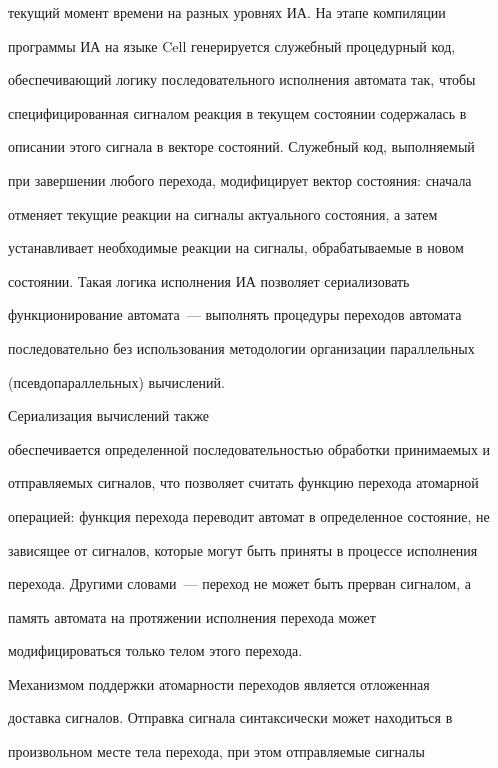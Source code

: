 текущий момент времени на разных уровнях ИА. На этапе компиляции 


программы ИА на языке Cell генерируется служебный процедурный код, 


обеспечивающий логику последовательного исполнения автомата так, чтобы 


специфицированная сигналом реакция в текущем состоянии содержалась в 


описании этого сигнала в векторе состояний. Служебный код, выполняемый 


при завершении любого перехода, модифицирует вектор состояния: сначала 


отменяет текущие реакции на сигналы актуального состояния, а затем 


устанавливает необходимые реакции на сигналы, обрабатываемые в новом 


состоянии. Такая логика исполнения ИА позволяет сериализовать 


функционирование автомата~--- выполнять процедуры переходов автомата 


последовательно без использования методологии организации параллельных 


(псевдопараллельных) вычислений. 





Сериализация вычислений также 


обеспечивается определенной последовательностью обработки принимаемых и 


отправляемых сигналов, что позволяет считать функцию перехода атомарной 


операцией: функция перехода переводит автомат в определенное состояние, не 


зависящее от сигналов, которые могут быть приняты в процессе исполнения 


перехода. Другими словами~--- переход не может быть прерван сигналом, а 


память автомата на протяжении исполнения перехода может 


модифицироваться только телом этого перехода.


      


      Механизмом поддержки атомарности переходов является отложенная 


доставка сигналов. Отправка сигнала синтаксически может находиться в 


произвольном месте тела перехода, при этом отправляемые сигналы 


